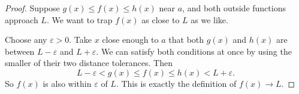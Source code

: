 \label{sec:special-case-proofs}


\begin{proof}
Suppose $g(x)\leq f(x)\leq h(x)$ near $a$, and both outside functions
approach $L$. We want to trap $f(x)$ as close to $L$ as we like.

Choose any $\varepsilon>0$. Take $x$ close enough to $a$ that both
$g(x)$ and $h(x)$ are between $L-\varepsilon$ and $L+\varepsilon$.
We can satisfy both conditions at once by using the smaller of their
two distance tolerances. Then
$$L-\varepsilon<g(x)\leq f(x)\leq h(x)<L+\varepsilon.$$
So $f(x)$ is also within $\varepsilon$ of $L$. This is exactly the
definition of $f(x)\to L$.
\end{proof}


